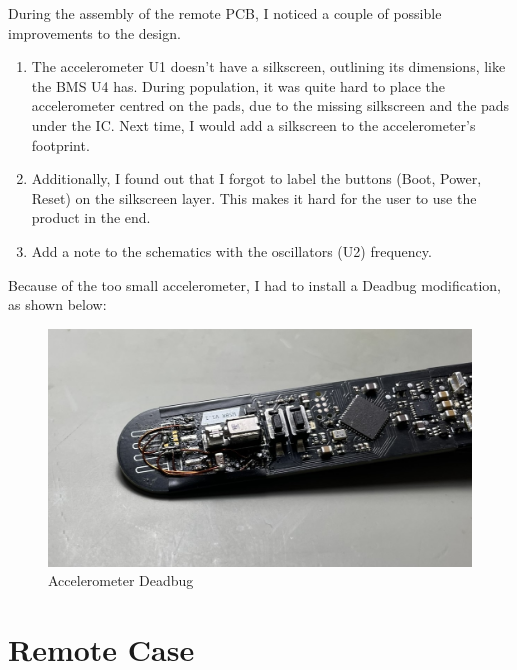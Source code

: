  During the assembly of the remote PCB, I noticed a couple of possible improvements to the design.
 \begin{enumerate}
     \item The accelerometer U1 doesn't have a silkscreen, outlining its dimensions, like the BMS U4 has. During population, it was quite hard to place the accelerometer centred on the pads, due to the missing silkscreen and the pads under the IC. Next time, I would add a silkscreen to the accelerometer's footprint. 
     \item Additionally, I found out that I forgot to label the buttons (Boot, Power, Reset) on the silkscreen layer. This makes it hard for the user to use the product in the end.
     \item Add a note to the schematics with the oscillators (U2) frequency.
 \end{enumerate}

Because of the too small accelerometer, I had to install a Deadbug modification, as shown below:

 \begin{figure}[H]
	\centering
	\includegraphics[width=16cm]{2_Documentation/Documentation_Wireless_ScoreBoard_Remote/Resources/IMG_1448.JPEG}
	\caption{Accelerometer Deadbug}
	\label{fig:Accelerometer Deadbug}
\end{figure}

 \section{Remote Case}

